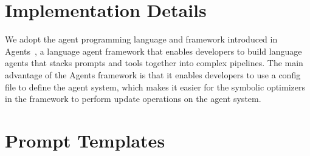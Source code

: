 \newpage
\appendix
\section{Implementation Details}
We adopt the agent programming language and framework introduced in Agents~\citep{zhou2023agents}, a language agent framework that enables developers to build language agents that stacks prompts and tools together into complex pipelines. The main advantage of the Agents framework is that it enables developers to use a config file to define the agent system, which makes it easier for the symbolic optimizers in the \baby framework to perform update operations on the agent system.

\section{Prompt Templates}







